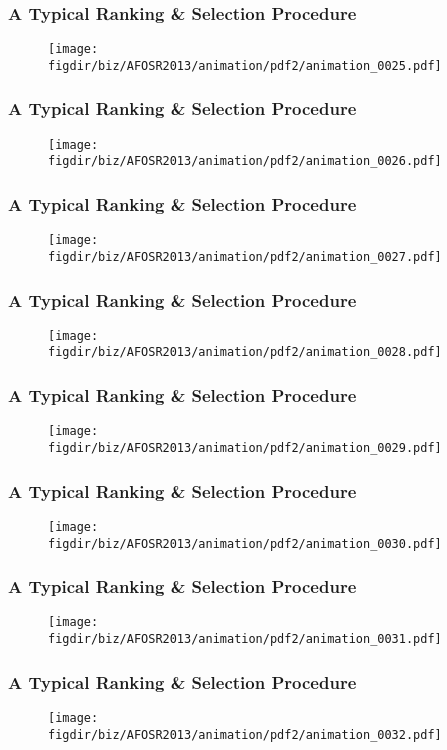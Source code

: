 \documentclass[13pt]{beamer}
\newcommand{\figdir}{../../fig}
\begin{document}
{\begin{frame}\frametitle{A Typical Ranking \& Selection Procedure}\begin{figure}\texttt{[image: \\figdir/biz/AFOSR2013/animation/pdf2/animation\_0025.pdf]}\end{figure}\end{frame}
\begin{frame}\frametitle{A Typical Ranking \& Selection Procedure}\begin{figure}\texttt{[image: \\figdir/biz/AFOSR2013/animation/pdf2/animation\_0026.pdf]}\end{figure}\end{frame}
\begin{frame}\frametitle{A Typical Ranking \& Selection Procedure}\begin{figure}\texttt{[image: \\figdir/biz/AFOSR2013/animation/pdf2/animation\_0027.pdf]}\end{figure}\end{frame}
\begin{frame}\frametitle{A Typical Ranking \& Selection Procedure}\begin{figure}\texttt{[image: \\figdir/biz/AFOSR2013/animation/pdf2/animation\_0028.pdf]}\end{figure}\end{frame}
\begin{frame}\frametitle{A Typical Ranking \& Selection Procedure}\begin{figure}\texttt{[image: \\figdir/biz/AFOSR2013/animation/pdf2/animation\_0029.pdf]}\end{figure}\end{frame}
\begin{frame}\frametitle{A Typical Ranking \& Selection Procedure}\begin{figure}\texttt{[image: \\figdir/biz/AFOSR2013/animation/pdf2/animation\_0030.pdf]}\end{figure}\end{frame}
\begin{frame}\frametitle{A Typical Ranking \& Selection Procedure}\begin{figure}\texttt{[image: \\figdir/biz/AFOSR2013/animation/pdf2/animation\_0031.pdf]}\end{figure}\end{frame}
\begin{frame}\frametitle{A Typical Ranking \& Selection Procedure}\begin{figure}\texttt{[image: \\figdir/biz/AFOSR2013/animation/pdf2/animation\_0032.pdf]}\end{figure}\end{frame}
}
\end{document}
